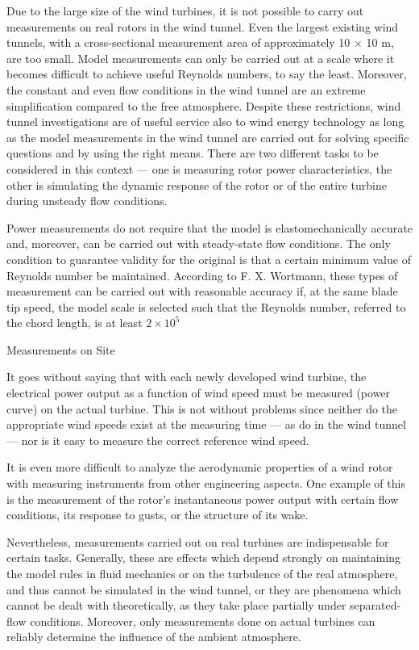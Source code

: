 
Due to the large size of the wind turbines, it is not possible to carry out measurements on real rotors in the wind tunnel. Even the largest existing wind tunnels, with a cross-sectional measurement area of approximately 10 × 10 m, are too small. Model measurements can only be carried out at a scale where it becomes difficult to achieve useful Reynolds numbers, to say the least. Moreover, the constant and even flow conditions in the wind tunnel are an extreme simplification compared to the free atmosphere. Despite these restrictions, wind tunnel investigations are of useful service also to wind energy technology as long as the model measurements in the wind tunnel are carried out for solving specific questions and by using the right means. There are two different tasks to be considered in this context — one is measuring rotor power characteristics, the other is simulating the dynamic response of the rotor or of the entire turbine during unsteady flow conditions.

Power measurements do not require that the model is elastomechanically accurate and, moreover, can be carried out with steady-state flow conditions. The only condition to guarantee validity for the original is that a certain minimum value of Reynolds number be maintained. According to F. X. Wortmann, these types of measurement can be carried out with reasonable accuracy if, at the same blade tip speed, the model scale is selected such that the Reynolds number, referred to the chord length, is at least $2 \times 10^5$

Measurements on Site

It goes without saying that with each newly developed wind turbine, the electrical power output as a function of wind speed must be measured (power curve) on the actual turbine. This is not without problems since neither do the appropriate wind speeds exist at the measuring time — as do in the wind tunnel — nor is it easy to measure the correct reference wind speed.

It is even more difficult to analyze the aerodynamic properties of a wind rotor with measuring instruments from other engineering aspects. One example of this is the measurement of the rotor’s instantaneous power output with certain flow conditions, its response to gusts, or the structure of its wake.

Nevertheless, measurements carried out on real turbines are indispensable for certain tasks. Generally, these are effects which depend strongly on maintaining the model rules in fluid mechanics or on the turbulence of the real atmosphere, and thus cannot be simulated
in the wind tunnel, or they are phenomena which cannot be dealt with theoretically, as
they take place partially under separated-flow conditions. Moreover, only measurements
done on actual turbines can reliably determine the influence of the ambient atmosphere.


